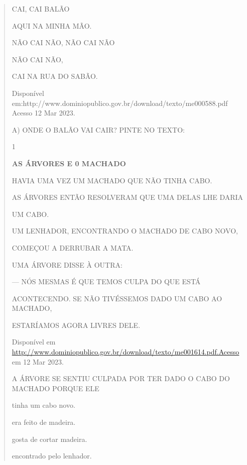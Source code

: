 \begin{verse}
{CAI, CAI BALÃO

AQUI NA MINHA MÃO.

NÃO CAI NÃO, NÃO CAI NÃO

NÃO CAI NÃO,

CAI NA RUA DO SABÃO.

Disponível
em:http://www.dominiopublico.gov.br/download/texto/me000588.pdf Acesso
12 Mar 2023.

A) ONDE O BALÃO VAI CAIR? PINTE NO TEXTO:


\num{1}

\textbf{AS ÁRVORES E 0 MACHADO}

HAVIA UMA VEZ UM MACHADO QUE NÃO TINHA CABO.

AS ÁRVORES ENTÃO RESOLVERAM QUE UMA DELAS LHE DARIA

UM CABO.

UM LENHADOR, ENCONTRANDO O MACHADO DE CABO NOVO,

COMEÇOU A DERRUBAR A MATA.

UMA ÁRVORE DISSE À OUTRA:

--- NÓS MESMAS É QUE TEMOS CULPA DO QUE ESTÁ

ACONTECENDO. SE NÃO TIVÉSSEMOS DADO UM CABO AO MACHADO,

ESTARÍAMOS AGORA LIVRES DELE.

Disponível em
\url{http://www.dominiopublico.gov.br/download/texto/me001614.pdf.Acesso}
em 12 Mar 2023.

A ÁRVORE SE SENTIU CULPADA POR TER DADO O CABO DO MACHADO PORQUE ELE

\begin{escolha}
\item tinha um cabo novo.

\item era feito de madeira.

\item gosta de cortar madeira.

\itemfoi encontrado pelo lenhador.
\end{escolha}

}
\end{verse}
